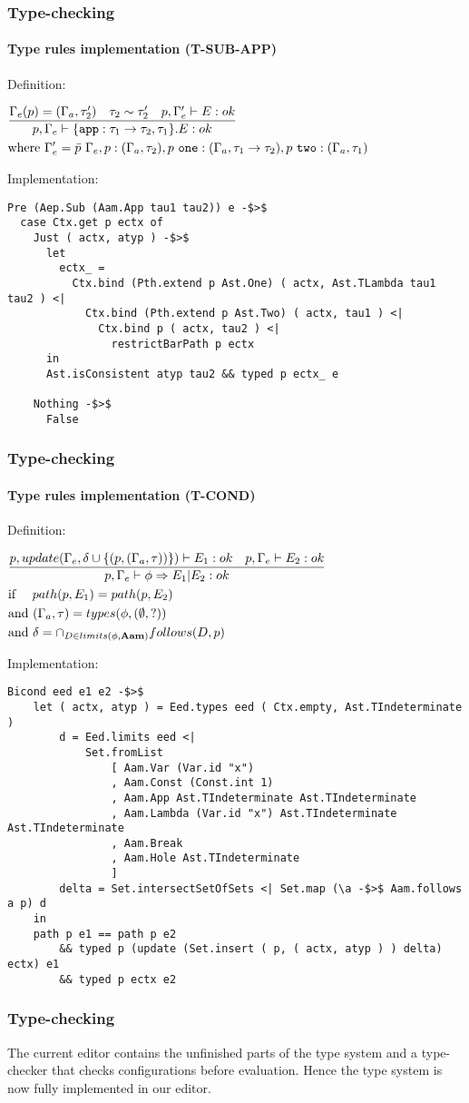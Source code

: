\begin{frame}[fragile]
    \frametitle{Type-checking}
    \framesubtitle{Type rules implementation (T-SUB-APP)}
    Definition:
    \begin{center}\scriptsize{$\begin{aligned} & \frac{\Gamma_{e}(p) = (\Gamma_{a},\tau_2') \quad \tau_2 \sim \tau_2' \quad p,\Gamma_{e}' \vdash E : ok} {p, \Gamma_{e} \vdash \{\texttt{app} : \tau_1\to\tau_2,\tau_1\}.E : ok}\\ & \text{where } \Gamma_{e}' = \bar{p}~\Gamma_{e},p : (\Gamma_{a},\tau_2),p~\texttt{one} : (\Gamma_{a},\tau_1\to\tau_2),p~\texttt{two} : (\Gamma_{a},\tau_1) \end{aligned}$}\end{center}
    \pause
    Implementation:
    \begin{lstlisting}[basicstyle=\tiny]
Pre (Aep.Sub (Aam.App tau1 tau2)) e -$>$
  case Ctx.get p ectx of
    Just ( actx, atyp ) -$>$
      let
        ectx_ =
          Ctx.bind (Pth.extend p Ast.One) ( actx, Ast.TLambda tau1 tau2 ) <|
            Ctx.bind (Pth.extend p Ast.Two) ( actx, tau1 ) <|
              Ctx.bind p ( actx, tau2 ) <|
                restrictBarPath p ectx
      in
      Ast.isConsistent atyp tau2 && typed p ectx_ e

    Nothing -$>$
      False
    \end{lstlisting}
\end{frame}

\begin{frame}[fragile]
    \frametitle{Type-checking}
    \framesubtitle{Type rules implementation (T-COND)}
    Definition:
    \begin{center}\scriptsize{$\begin{aligned} & \frac{p, update(\Gamma_{e},\delta \cup \{ (p, (\Gamma_{a}, \tau))\}) \vdash E_1 : ok \quad p, \Gamma_{e} \vdash E_2 : ok} {p, \Gamma_{e} \vdash \phi \Rightarrow E_1|E_2 : ok}\\ & \text{if~~~~} path(p,E_1) = path(p,E_2)\\ & \text{and } (\Gamma_{a},\tau) = types(\phi, (\emptyset,?))\\ & \text{and } \delta = \cap_{D \in limits(\phi,\textbf{Aam})} follows(D,p) \end{aligned}$}\end{center}
    \pause
    Implementation:
    \begin{lstlisting}[basicstyle=\tiny]
Bicond eed e1 e2 -$>$
    let ( actx, atyp ) = Eed.types eed ( Ctx.empty, Ast.TIndeterminate )
        d = Eed.limits eed <|
            Set.fromList
                [ Aam.Var (Var.id "x")
                , Aam.Const (Const.int 1)
                , Aam.App Ast.TIndeterminate Ast.TIndeterminate
                , Aam.Lambda (Var.id "x") Ast.TIndeterminate Ast.TIndeterminate
                , Aam.Break
                , Aam.Hole Ast.TIndeterminate
                ]
        delta = Set.intersectSetOfSets <| Set.map (\a -$>$ Aam.follows a p) d
    in
    path p e1 == path p e2
        && typed p (update (Set.insert ( p, ( actx, atyp ) ) delta) ectx) e1
        && typed p ectx e2
    \end{lstlisting}
\end{frame}

\begin{frame}
    \frametitle{Type-checking}
    The current editor contains the unfinished parts of the type system and a
    type-checker that checks configurations before evaluation. Hence the
    type system is now fully implemented in our editor.
\end{frame}
